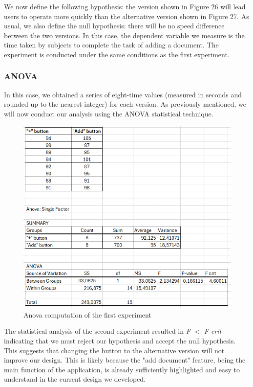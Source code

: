 			\noindent
			We now define the following hypothesis: the version shown in Figure 26 will lead users to operate more quickly than the alternative version shown in Figure 27. As usual, we also define the null hypothesis: there will be no speed difference between the two versions. In this case, the dependent variable we measure is the time taken by subjects to complete the task of adding a document. The experiment is conducted under the same conditions as the first experiment.\\
			\clearpage
		\subsubsection{ANOVA}
			In this case, we obtained a series of eight-time values (measured in seconds and rounded up to the nearest integer) for each version. As previously mentioned, we will now conduct our analysis using the ANOVA statistical technique.
			\begin{figure}[htbp]
				\centering
				\includegraphics[width=1\textwidth]{../Draw.io diagrams/anova_+_add.png}  %
				\caption{Anova computation of the first experiment}
			\end{figure}
			
			\noindent
			The statistical analysis of the second experiment resulted in \textit{F} \(<\) \textit{F crit} indicating that we must reject our hypothesis and accept the null hypothesis. This suggests that changing the button to the alternative version will not improve our design. This is likely because the "add document" feature, being the main function of the application, is already sufficiently highlighted and easy to understand in the current design we developed.
			\clearpage

